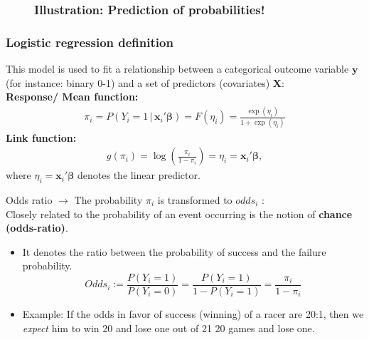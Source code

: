\documentclass{beamer}
\newcommand{\ve}[1]{\mbox{$\boldsymbol{#1}$}}
\begin{document}
\begin{frame}
	\begin{figure}	
		\frametitle{Illustration: Prediction of probabilities!}
		\centering
		\hspace*{-0.8cm}
	\end{figure}
\end{frame}

\begin{frame}

				\frametitle{Logistic regression definition}

		This model is used to fit a relationship between a categorical outcome variable $\textbf{y}$ (for instance: binary 0-1) and a set of predictors (covariates) $\textbf{X}$:\\[2mm]
		\textbf{Response/ Mean function:}
		\begin{align}\nonumber
			\pi_i=P(Y_i=1\,|\,\ve{x}_i'\ve{\beta})=F(\eta_i)=\frac{\exp{(\eta_i)}}{1 + \exp{(\eta_i)}}
		\end{align}
		\textbf{Link function:}
		\begin{align}\nonumber
			g(\pi_i)=\log\left(\frac{\pi_i}{1-\pi_i}\right)=\eta_i = \ve{x}_i' \ve{\beta},
		\end{align}
		where $\eta_i=\ve{x}_i' \ve{\beta}$ denotes the linear predictor.

		
		

\end{frame}


\begin{frame}{Odds ratio}
	\vspace{-3mm}
	$\rightarrow$ The probability $\pi_i$ is transformed to $odds_i$ :\\
	\vspace{2mm}
	Closely related to the probability of an event occurring is the notion of \textbf{chance (odds-ratio)}.
	\vspace{2mm}
	\begin{itemize}
		\item It denotes the ratio between the probability of success and the failure probability.
		$$Odds_i:=\frac{P(Y_i=1)}{P(Y_i=0)}=\frac{P(Y_i=1)}{1-P(Y_i=1)}=\frac{\pi_i}{1-\pi_i}$$
		\item Example: If the odds in favor of success (winning) of a
		racer are 20:1, then we \emph{expect} him to win 20 and lose one out of 21
		20 games and lose one.
	\end{itemize}
\end{frame}
\end{document}
